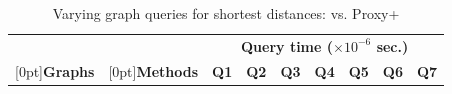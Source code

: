 \begin{table}[t!]
\caption{Varying graph queries  for shortest distances: \arcflag   vs. Proxy+\arcflag}\label{tab:performance_dist_queries_af}
\vspace{-2ex}
\begin{center}

\begin{tabular}{|c|c||r|r|r|r|r|r|r|}
\hline
  &   & \multicolumn{7}{c|}{\bf Query time ($\times 10^{-6}$ sec.)} \\
\cline{3-9}

\raisebox{1.5ex}[0pt]{\bf Graphs} & \raisebox{1.5ex}[0pt]{\bf Methods} & {\bf Q1} & {\bf Q2} & {\bf Q3} & {\bf Q4} & {\bf Q5} & {\bf Q6} & {\bf Q7}  \\ \hline \hline



\end{tabular}
\end{center}
\end{table}
